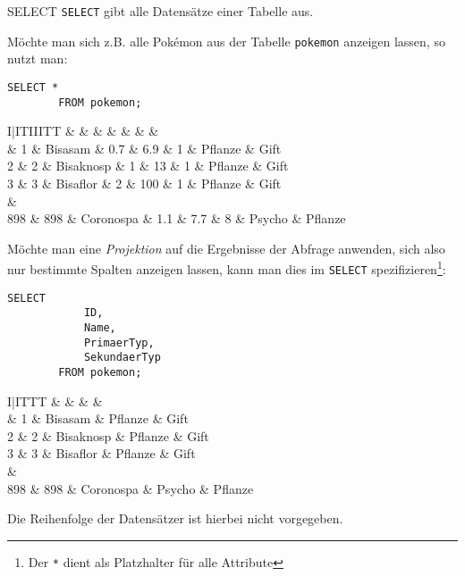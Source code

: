 \begin{sql}{SELECT}
    \texttt{SELECT} gibt alle Datensätze einer Tabelle aus.

    Möchte man sich z.B. alle Pokémon aus der Tabelle \texttt{pokemon} anzeigen lassen, so nutzt man:

    \begin{lstlisting}[language=mysql]
        SELECT *
        FROM pokemon;
    \end{lstlisting}

    \setcounter{rownum}{0}
    \begin{tabular}{I|ITIIITT}
        &  &  &  &  &  &  &  \\ & 1 & Bisasam & 0.7 & 6.9 & 1 & Pflanze & Gift \\
        2 & 2 & Bisaknosp & 1 & 13 & 1 & Pflanze & Gift \\
        3 & 3 & Bisaflor & 2 & 100 & 1 & Pflanze & Gift \\
         &  \\
        898 & 898 & Coronospa & 1.1 & 7.7 & 8 & Psycho & Pflanze \\
    \end{tabular}

    Möchte man eine \emph{Projektion} auf die Ergebnisse der Abfrage anwenden, sich also nur bestimmte Spalten anzeigen lassen, kann man dies im \texttt{SELECT} spezifizieren\footnote{Der \texttt{*} dient als Platzhalter für alle Attribute}:

    \begin{lstlisting}[language=mysql]
        SELECT
            ID,
            Name,
            PrimaerTyp,
            SekundaerTyp
        FROM pokemon;
    \end{lstlisting}

    \setcounter{rownum}{0}
    \begin{tabular}{I|ITTT}
        &  &  &  &  \\ & 1 & Bisasam & Pflanze & Gift \\
        2 & 2 & Bisaknosp & Pflanze & Gift \\
        3 & 3 & Bisaflor & Pflanze & Gift \\
         &  \\
        898 & 898 & Coronospa & Psycho & Pflanze \\
    \end{tabular}

    Die Reihenfolge der Datensätzer ist hierbei nicht vorgegeben.
\end{sql}

